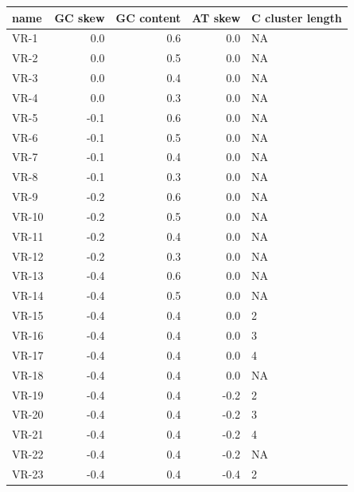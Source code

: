 \documentclass[11pt]{article}
\begin{document}
\begin{table}
	\label{table:2}
	\centering
\begin{tabular}{lrrrl}
	\toprule
	name &  GC skew &  GC content &  AT skew & C cluster length \\
	\midrule
	VR-1 &      0.0 &         0.6 &      0.0 &             NA \\
	VR-2 &      0.0 &         0.5 &      0.0 &             NA \\
	VR-3 &      0.0 &         0.4 &      0.0 &             NA \\
	VR-4 &      0.0 &         0.3 &      0.0 &             NA \\
	VR-5 &     -0.1 &         0.6 &      0.0 &             NA \\
	VR-6 &     -0.1 &         0.5 &      0.0 &             NA \\
	VR-7 &     -0.1 &         0.4 &      0.0 &             NA \\
	VR-8 &     -0.1 &         0.3 &      0.0 &             NA \\
	VR-9 &     -0.2 &         0.6 &      0.0 &             NA \\
	VR-10 &     -0.2 &         0.5 &      0.0 &             NA \\
	VR-11 &     -0.2 &         0.4 &      0.0 &             NA \\
	VR-12 &     -0.2 &         0.3 &      0.0 &             NA \\
	VR-13 &     -0.4 &         0.6 &      0.0 &             NA \\
	VR-14 &     -0.4 &         0.5 &      0.0 &             NA \\
	VR-15 &     -0.4 &         0.4 &      0.0 &              2 \\
	VR-16 &     -0.4 &         0.4 &      0.0 &              3 \\
	VR-17 &     -0.4 &         0.4 &      0.0 &              4 \\
	VR-18 &     -0.4 &         0.4 &      0.0 &             NA \\
	VR-19 &     -0.4 &         0.4 &     -0.2 &              2 \\
	VR-20 &     -0.4 &         0.4 &     -0.2 &              3 \\
	VR-21 &     -0.4 &         0.4 &     -0.2 &              4 \\
	VR-22 &     -0.4 &         0.4 &     -0.2 &             NA \\
	VR-23 &     -0.4 &         0.4 &     -0.4 &              2 \\

\end{tabular}
\end{table}
\end{document}
